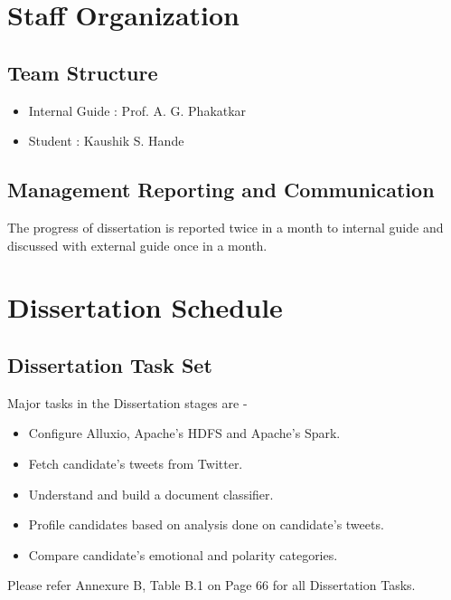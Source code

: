 \documentclass[oneside,a4paper,12pt]{pictreport}
\begin{document}
\section{Staff Organization}

\subsection{Team Structure}
\begin{itemize}
    \item Internal Guide : Prof. A. G. Phakatkar
    \item Student : Kaushik S. Hande 
\end{itemize}

\subsection{Management Reporting and Communication}
The progress of dissertation is reported twice in a month to internal guide and discussed with external guide once in a month.
\section{Dissertation Schedule}
\subsection{Dissertation Task Set}
Major tasks in the Dissertation stages are - 
\begin{itemize}
\item Configure Alluxio, Apache's HDFS and Apache's Spark.
\item Fetch candidate's tweets from Twitter.
\item Understand and build a document classifier.
\item Profile candidates based on analysis done on candidate's tweets.
\item Compare candidate's emotional and polarity categories.
\end{itemize}
Please refer Annexure B, Table B.1 on Page 66 for all Dissertation Tasks.
\end{document}
